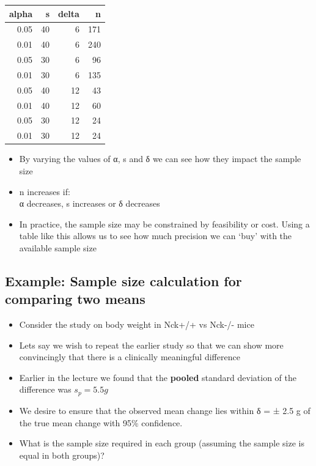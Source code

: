 \documentclass[
]{book}
\providecommand{\tightlist}{%
  \setlength{\itemsep}{0pt}\setlength{\parskip}{0pt}}
\begin{document}
\begin{tabular}{r|r|r|r}
\hline
alpha & s & delta & n\\
\hline
0.05 & 40 & 6 & 171\\
\hline
0.01 & 40 & 6 & 240\\
\hline
0.05 & 30 & 6 & 96\\
\hline
0.01 & 30 & 6 & 135\\
\hline
0.05 & 40 & 12 & 43\\
\hline
0.01 & 40 & 12 & 60\\
\hline
0.05 & 30 & 12 & 24\\
\hline
0.01 & 30 & 12 & 24\\
\hline
\end{tabular}

\begin{itemize}
\tightlist
\item
  By varying the values of α, s and δ we can see how they impact the sample size
\item
  n increases if:\\
  α decreases, s increases or δ decreases\\
\item
  In practice, the sample size may be constrained by feasibility or cost. Using a table like this allows us to see how much precision we can `buy' with the available sample size
\end{itemize}

\hypertarget{example-sample-size-calculation-for-comparing-two-means}{%
\subsection{Example: Sample size calculation for comparing two means}\label{example-sample-size-calculation-for-comparing-two-means}}

\begin{itemize}
\tightlist
\item
  Consider the study on body weight in Nck+/+ vs Nck-/- mice
\item
  Lets say we wish to repeat the earlier study so that we can show more convincingly that there is a clinically meaningful difference
\item
  Earlier in the lecture we found that the \textbf{pooled} standard deviation of the difference was \(s_p=5.5g\)
\item
  We desire to ensure that the observed mean change lies within δ = ± 2.5 g of the true mean change with 95\% confidence.
\item
  What is the sample size required in each group (assuming the sample size is equal in both groups)?
\end{itemize}
\end{document}
